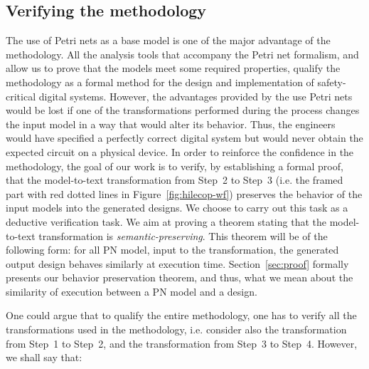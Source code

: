 \subsection{Verifying the \hilecop{} methodology}
\label{sec:verif-hilecop}

The use of Petri nets as a base model is one of the major advantage of
the \hilecop{} methodology. All the analysis tools that accompany the
Petri net formalism, and allow us to prove that the models meet some
required properties, qualify the \hilecop{} methodology as a formal
method for the design and implementation of safety-critical digital
systems. However, the advantages provided by the use Petri nets would
be lost if one of the transformations performed during the process
changes the input model in a way that would alter its behavior. Thus,
the engineers would have specified a perfectly correct digital system
but would never obtain the expected circuit on a physical device. In
order to reinforce the confidence in the \hilecop{} methodology, the
goal of our work is to verify, by establishing a formal proof, that
the model-to-text transformation from Step~2 to Step~3 (i.e. the
framed part with red dotted lines in Figure~\ref{fig:hilecop-wf})
preserves the behavior of the input models into the generated \vhdl{}
designs. We choose to carry out this task as a deductive verification
task.  We aim at proving a theorem stating that the \hilecop{}
model-to-text transformation is \textit{semantic-preserving}. This
theorem will be of the following form: for all PN model, input to the
\hilecop{} transformation, the generated output \vhdl{} design behaves
similarly at execution time. Section~\ref{sec:proof} formally presents
our behavior preservation theorem, and thus, what we mean about the
similarity of execution between a PN model and a \vhdl{} design.

One could argue that to qualify the entire \hilecop{} methodology, one
has to verify all the transformations used in the methodology,
i.e. consider also the transformation from Step~1 to Step~2, and the
transformation from Step~3 to Step~4. However, we shall say that:

